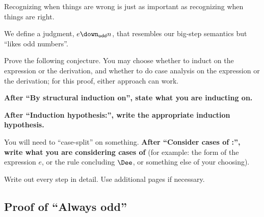 Recognizing when things are wrong is just as important as recognizing when
things are right.

We define a judgment, $e \downodd n$, that resembles our big-step semantics
but ``likes odd numbers''.

\medskip
{}
\vspace*{-1.2ex}

Prove the following conjecture.  You may choose whether to induct on the expression
or the derivation, and whether to do case analysis on the expression or the derivation;
for this proof, either approach can work.

\textbf{After ``By structural induction on'', state what you are inducting on.}

\textbf{After ``Induction hypothesis:'', write the appropriate induction hypothesis.}

You will need to ``case-split'' on something.
\textbf{After ``Consider cases of :'', write what you are considering cases of}
(for example: the form of the expression $e$, or the rule concluding $\Dee$,
or something else of your choosing).

Write out every step in detail.  Use additional pages if necessary.

\subsection*{Proof of ``Always odd''}


